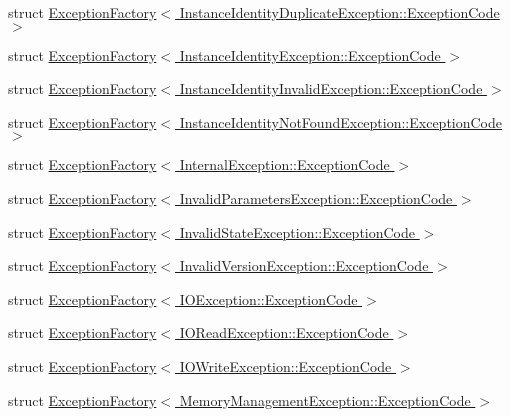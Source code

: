 \begin{DoxyCompactItemize}
\item 
struct \hyperlink{structMezzanine_1_1ExceptionFactory_3_01InstanceIdentityDuplicateException_1_1ExceptionCode_01_4}{Exception\-Factory$<$ Instance\-Identity\-Duplicate\-Exception\-::\-Exception\-Code $>$}
\item 
struct \hyperlink{structMezzanine_1_1ExceptionFactory_3_01InstanceIdentityException_1_1ExceptionCode_01_4}{Exception\-Factory$<$ Instance\-Identity\-Exception\-::\-Exception\-Code $>$}
\item 
struct \hyperlink{structMezzanine_1_1ExceptionFactory_3_01InstanceIdentityInvalidException_1_1ExceptionCode_01_4}{Exception\-Factory$<$ Instance\-Identity\-Invalid\-Exception\-::\-Exception\-Code $>$}
\item 
struct \hyperlink{structMezzanine_1_1ExceptionFactory_3_01InstanceIdentityNotFoundException_1_1ExceptionCode_01_4}{Exception\-Factory$<$ Instance\-Identity\-Not\-Found\-Exception\-::\-Exception\-Code $>$}
\item 
struct \hyperlink{structMezzanine_1_1ExceptionFactory_3_01InternalException_1_1ExceptionCode_01_4}{Exception\-Factory$<$ Internal\-Exception\-::\-Exception\-Code $>$}
\item 
struct \hyperlink{structMezzanine_1_1ExceptionFactory_3_01InvalidParametersException_1_1ExceptionCode_01_4}{Exception\-Factory$<$ Invalid\-Parameters\-Exception\-::\-Exception\-Code $>$}
\item 
struct \hyperlink{structMezzanine_1_1ExceptionFactory_3_01InvalidStateException_1_1ExceptionCode_01_4}{Exception\-Factory$<$ Invalid\-State\-Exception\-::\-Exception\-Code $>$}
\item 
struct \hyperlink{structMezzanine_1_1ExceptionFactory_3_01InvalidVersionException_1_1ExceptionCode_01_4}{Exception\-Factory$<$ Invalid\-Version\-Exception\-::\-Exception\-Code $>$}
\item 
struct \hyperlink{structMezzanine_1_1ExceptionFactory_3_01IOException_1_1ExceptionCode_01_4}{Exception\-Factory$<$ I\-O\-Exception\-::\-Exception\-Code $>$}
\item 
struct \hyperlink{structMezzanine_1_1ExceptionFactory_3_01IOReadException_1_1ExceptionCode_01_4}{Exception\-Factory$<$ I\-O\-Read\-Exception\-::\-Exception\-Code $>$}
\item 
struct \hyperlink{structMezzanine_1_1ExceptionFactory_3_01IOWriteException_1_1ExceptionCode_01_4}{Exception\-Factory$<$ I\-O\-Write\-Exception\-::\-Exception\-Code $>$}
\item 
struct \hyperlink{structMezzanine_1_1ExceptionFactory_3_01MemoryManagementException_1_1ExceptionCode_01_4}{Exception\-Factory$<$ Memory\-Management\-Exception\-::\-Exception\-Code $>$}

\end{DoxyCompactItemize}
